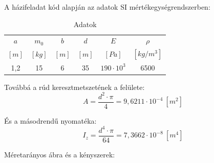 \documentclass{article}
\begin{document}
	A házifeladat kód alapján az adatok SI mértékegységrendszerben:
	\def\arraystretch{1.2}%
	\begin{table}[h!]
		\begin{center}
			\caption{Adatok}
			\label{tab:table1}
			\begin{tabular}{c|c|c|c|c|c} %
				$a$ & $m_{0}$ & $b$ & $d$ & $E$ & $\rho$\\
				$[m]$ & $[kg]$ & $[m]$ & $[m]$ & $[Pa]$ & $[kg/m^{3}]$\\
				\hline
				1,2 & 15 & 6 & 35 & $190\cdot10^3$ & 6500\\
			\end{tabular}
		\end{center}
	\end{table}
	\def\arraystretch{1}%
	
	Továbbá a rúd keresztmetszetének a felülete:
	\begin{equation}
	A=\frac{d^{2}\cdot\pi}{4}=9,6211 \cdot 10^{-4}~[m^{2}]
	\end{equation}
	
	És a másodrendű nyomatéka:
	\begin{equation}
	I_{z}=\frac{d^4\cdot\pi}{64}=7,3662 \cdot 10^{-8}~[m^{4}]
	\end{equation}
	
	Méretarányos ábra és a kényszerek:
	
	\newcommand{\sugar}{2}
	\newcommand{\ab}{600}
	\newcommand{\bc}{120}
	\newcommand{\acv}{701}
	\newcommand{\ac}{720}
	\newcommand{\acvv}{735}
	
\end{document}
